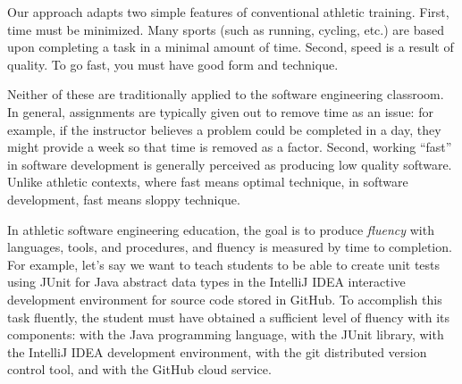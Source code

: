 Our approach adapts two simple features of conventional athletic training. First, time must be minimized.  Many sports (such as running, cycling, etc.) are based upon completing a task in a minimal amount of time.  Second, speed is a result of quality. To go fast, you must have good form and technique. 

Neither of these are traditionally applied to the software engineering classroom. In general, assignments are typically given out to remove time as an issue: for example, if the instructor believes a problem could be completed in a day, they might provide a week so that time is removed as a factor.  Second, working ``fast'' in software development is generally perceived as producing low quality software. Unlike athletic contexts, where fast means optimal technique, in software development, fast means sloppy technique. 

In athletic software engineering education, the goal is to produce {\em fluency} with languages, tools, and procedures, and fluency is measured by time to completion. For example, let's say we want to teach students to be able to create unit tests using JUnit for Java abstract data types in the IntelliJ IDEA interactive development environment for source code stored in GitHub. To accomplish this task fluently, the student must have obtained a sufficient level of fluency with its components: with the Java programming language, with the JUnit library, with the IntelliJ IDEA development environment, with the git distributed version control tool, and with the GitHub cloud service. 








